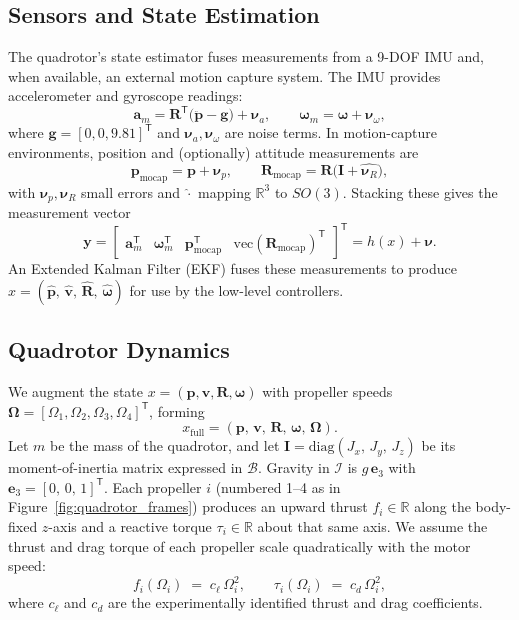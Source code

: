 \subsection{Sensors and State Estimation}
\label{sec:quadrotor_estimation}
The quadrotor’s state estimator fuses measurements from a 9-DOF IMU and, when available, an external motion capture system. The IMU provides accelerometer and gyroscope readings:
\[
\mathbf{a}_m = \mathbf{R}^\mathsf{T}\bigl(\ddot{\mathbf{p}} - \mathbf{g}\bigr) + \boldsymbol{\nu}_a,\qquad
\boldsymbol{\omega}_m = \boldsymbol{\omega} + \boldsymbol{\nu}_\omega,
\]
where \(\mathbf{g}=[0,0,9.81]^\mathsf{T}\) and \(\boldsymbol{\nu}_a,\boldsymbol{\nu}_\omega\) are noise terms. In motion-capture environments, position and (optionally) attitude measurements are
\[
\mathbf{p}_{\mathrm{mocap}} = \mathbf{p} + \boldsymbol{\nu}_p,\qquad
\mathbf{R}_{\mathrm{mocap}} = \mathbf{R}\bigl(\mathbf{I} + \widehat{\boldsymbol{\nu}_R}\bigr),
\]
with \(\boldsymbol{\nu}_p,\boldsymbol{\nu}_R\) small errors and \(\widehat{\cdot}\) mapping \(\mathbb{R}^3\) to \(SO(3)\). Stacking these gives the measurement vector
\[
\mathbf{y} = \begin{bmatrix}
\mathbf{a}_m^\mathsf{T} & \boldsymbol{\omega}_m^\mathsf{T} & \mathbf{p}_{\mathrm{mocap}}^\mathsf{T} & \mathrm{vec}(\mathbf{R}_{\mathrm{mocap}})^\mathsf{T}
\end{bmatrix}^\mathsf{T} = h(x) + \boldsymbol{\nu}.
\]
An Extended Kalman Filter (EKF) fuses these measurements to produce \(\hat{x} = (\hat{\mathbf{p}},\,\hat{\mathbf{v}},\,\hat{\mathbf{R}},\,\hat{\boldsymbol{\omega}})\) for use by the low-level controllers.
\subsection{Quadrotor Dynamics}
\label{sec:quadrotor_dynamics}
We augment the state \(x=(\mathbf{p},\mathbf{v},\mathbf{R},\boldsymbol{\omega})\) with propeller speeds \(\boldsymbol{\Omega}=[\Omega_1,\Omega_2,\Omega_3,\Omega_4]^\mathsf{T}\), forming
\[
x_{\mathrm{full}} = (\mathbf{p},\,\mathbf{v},\,\mathbf{R},\,\boldsymbol{\omega},\,\boldsymbol{\Omega}).
\]
Let \(m\) be the mass of the quadrotor, and let \(\mathbf{I} = \mathrm{diag}(J_{x},\,J_{y},\,J_{z})\) be its moment-of-inertia matrix expressed in \(\mathcal{B}\). Gravity in \(\mathcal{I}\) is \(g\,\mathbf{e}_{3}\) with \(\mathbf{e}_{3} = [0,\,0,\,1]^{\mathsf{T}}\). Each propeller \(i\) (numbered 1–4 as in Figure~\ref{fig:quadrotor_frames}) produces an upward thrust \(f_{i} \in \mathbb{R}\) along the body-fixed \(z\)-axis and a reactive torque \(\tau_{i}\in \mathbb{R}\) about that same axis. We assume the thrust and drag torque of each propeller scale quadratically with the motor speed:
\[
f_{i}(\Omega_{i}) \;=\; c_{\ell}\,\Omega_{i}^{2}, 
\qquad 
\tau_{i}(\Omega_{i}) \;=\; c_{d}\,\Omega_{i}^{2},
\]
where \(c_{\ell}\) and \(c_{d}\) are the experimentally identified thrust and drag coefficients.


